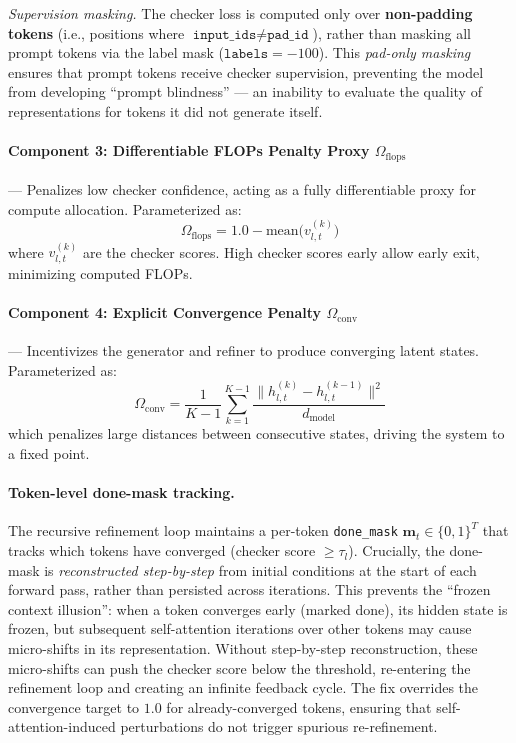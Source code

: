 \documentclass[11pt,a4paper]{article}
\theoremstyle{definition}
\begin{document}
\textit{Supervision masking.} The checker loss is computed only over \textbf{non-padding tokens} (i.e., positions where $\texttt{input\_ids} \neq \texttt{pad\_id}$), rather than masking all prompt tokens via the label mask ($\texttt{labels} = -100$). This \textit{pad-only masking} ensures that prompt tokens receive checker supervision, preventing the model from developing ``prompt blindness'' --- an inability to evaluate the quality of representations for tokens it did not generate itself.

\paragraph{Component 3: Differentiable FLOPs Penalty Proxy $\Omega_{\text{flops}}$} --- Penalizes low checker confidence, acting as a fully differentiable proxy for compute allocation. Parameterized as:
\[ \Omega_{\text{flops}} = 1.0 - \text{mean}\bigl(v_{l,t}^{(k)}\bigr) \]
where $v_{l,t}^{(k)}$ are the checker scores. High checker scores early allow early exit, minimizing computed FLOPs.

\paragraph{Component 4: Explicit Convergence Penalty $\Omega_{\text{conv}}$} --- Incentivizes the generator and refiner to produce converging latent states. Parameterized as:
\[ \Omega_{\text{conv}} = \frac{1}{K-1} \sum_{k=1}^{K-1} \frac{\|h_{l,t}^{(k)} - h_{l,t}^{(k-1)}\|^2}{d_{\text{model}}} \]
which penalizes large distances between consecutive states, driving the system to a fixed point.

\paragraph{Token-level done-mask tracking.} The recursive refinement loop maintains a per-token \texttt{done\_mask} $\mathbf{m}_t \in \{0, 1\}^T$ that tracks which tokens have converged (checker score $\geq \tau_l$). Crucially, the done-mask is \textit{reconstructed step-by-step} from initial conditions at the start of each forward pass, rather than persisted across iterations. This prevents the ``frozen context illusion'': when a token converges early (marked done), its hidden state is frozen, but subsequent self-attention iterations over other tokens may cause micro-shifts in its representation. Without step-by-step reconstruction, these micro-shifts can push the checker score below the threshold, re-entering the refinement loop and creating an infinite feedback cycle. The fix overrides the convergence target to $1.0$ for already-converged tokens, ensuring that self-attention-induced perturbations do not trigger spurious re-refinement.
\end{document}
